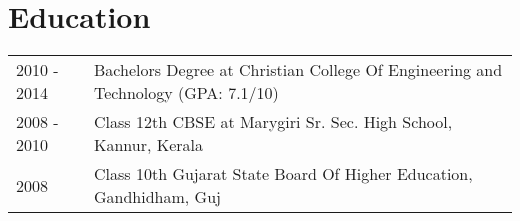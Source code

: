 \documentclass[a4paper,12pt]{article}
\begin{document}
\section{Education}
\begin{tabularx}{\linewidth}{@{}l X@{}}	

2010 - 2014 & Bachelors Degree at Christian College Of Engineering and Technology \hfill (GPA: 7.1/10) \\ 

2008 - 2010 & Class 12th CBSE at Marygiri Sr. Sec. High School, Kannur, Kerala \hfill   \\

2008 & Class 10th Gujarat State Board Of Higher Education, Gandhidham, Guj \hfill   \\
\end{tabularx}



\vfill
{}
\end{document}
